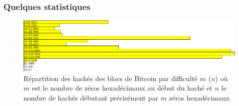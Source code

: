 \documentclass{beamer}
\begin{document}
\begin{frame}

\frametitle{Quelques statistiques}

\begin{figure}[H]
		\includegraphics[width=\linewidth]{illustrations/hexaHashesStats.png}
		\caption{Répartition des hachés des blocs de Bitcoin par difficulté $m$ ($n$) où $m$ est le nombre de zéros hexadécimaux au début du haché et $n$ le nombre de hachés débutant précisément par $m$ zéros hexadécimaux}
	\end{figure}

\end{frame}
\end{document}

